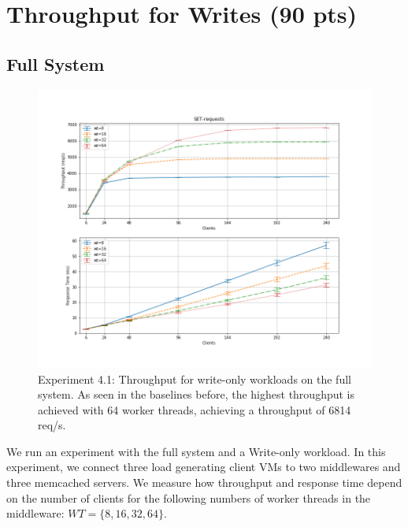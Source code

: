 \documentclass[11pt,a4paper]{article}
\begin{document}
\section{Throughput for Writes (90 pts)}

\subsection{Full System}

\begin{figure}
\centering

\includegraphics[width=1\textwidth]{41/41_set_requests}
\caption{Experiment 4.1: Throughput for write-only workloads on the full system. As seen in the baselines before, the highest throughput is achieved with 64 worker threads, achieving a throughput of 6814 req/s.}
\label{fig:41_set}
\end{figure}


We run an experiment with the full system and a Write-only workload. In this experiment, we connect three load generating client VMs to two middlewares and three memcached servers. We measure how throughput and response time depend on the number of clients for the following numbers of worker threads in the middleware: $WT = \{8, 16, 32, 64 \}$.
\end{document}
